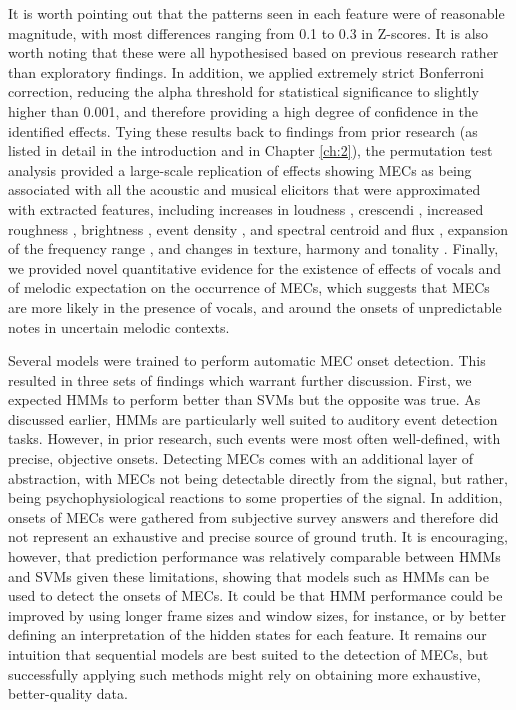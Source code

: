 It is worth pointing out that the patterns seen in each feature were of reasonable magnitude, with most differences ranging from 0.1 to 0.3 in Z-scores. It is also worth noting that these were all hypothesised based on previous research rather than exploratory findings. In addition, we applied extremely strict Bonferroni correction, reducing the alpha threshold for statistical significance to slightly higher than 0.001, and therefore providing a high degree of confidence in the identified effects. Tying these results back to findings from prior research (as listed in detail in the introduction and in Chapter \ref{ch:2}), the permutation test analysis provided a large-scale replication of effects showing MECs as being associated with all the acoustic and musical elicitors that were approximated with extracted features, including increases in loudness \parencite[e.g.,][]{sloboda1991}, crescendi \parencite[e.g.,][]{panksepp1995}, increased roughness \parencite[e.g.,][]{grewe2007}, brightness \parencite[e.g.,][]{bannister2018}, event density \parencite[e.g.,][]{nagel2008}, and spectral centroid and flux \parencite[e.g.,][]{bannister2018}, expansion of the frequency range \parencite[e.g.,][]{guhn2007}, and changes in texture, harmony and tonality \parencite[e.g.,][]{sloboda1991}. Finally, we provided novel quantitative evidence for the existence of effects of vocals and of melodic expectation on the occurrence of MECs, which suggests that MECs are more likely in the presence of vocals, and around the onsets of unpredictable notes in uncertain melodic contexts.

Several models were trained to perform automatic MEC onset detection. This resulted in three sets of findings which warrant further discussion. First, we expected HMMs to perform better than SVMs but the opposite was true. As discussed earlier, HMMs are particularly well suited to auditory event detection tasks. However, in prior research, such events were most often well-defined, with precise, objective onsets. Detecting MECs comes with an additional layer of abstraction, with MECs not being detectable directly from the signal, but rather, being psychophysiological reactions to some properties of the signal. In addition, onsets of MECs were gathered from subjective survey answers and therefore did not represent an exhaustive and precise source of ground truth. It is encouraging, however, that prediction performance was relatively comparable between HMMs and SVMs given these limitations, showing that models such as HMMs can be used to detect the onsets of MECs. It could be that HMM performance could be improved by using longer frame sizes and window sizes, for instance, or by better defining an interpretation of the hidden states for each feature. It remains our intuition that sequential models are best suited to the detection of MECs, but successfully applying such methods might rely on obtaining more exhaustive, better-quality data.

